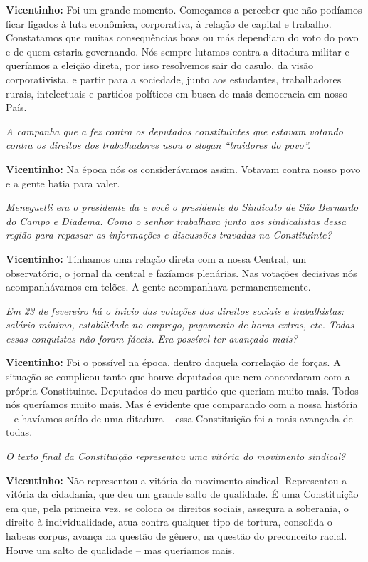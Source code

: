 \textbf{Vicentinho:} Foi um grande momento. Começamos a perceber que não
podíamos ficar ligados à luta econômica, corporativa, à relação de
capital e trabalho. Constatamos que muitas consequências boas ou más
dependiam do voto do povo e de quem estaria governando. Nós sempre
lutamos contra a ditadura militar e queríamos a eleição direta, por isso
resolvemos sair do casulo, da visão corporativista, e partir para a
sociedade, junto aos estudantes, trabalhadores rurais, intelectuais e
partidos políticos em busca de mais democracia em nosso País.

\emph{A campanha que a  fez contra os deputados constituintes que
estavam votando contra os direitos dos trabalhadores usou o slogan
``traidores do povo''.}

\textbf{Vicentinho:} Na época nós os considerávamos assim. Votavam
contra nosso povo e a gente batia para valer.

\emph{Meneguelli era o presidente da  e você o presidente do
Sindicato de São Bernardo do Campo e Diadema. Como o senhor trabalhava
junto aos sindicalistas dessa região para repassar as informações e
discussões travadas na Constituinte?}

\textbf{Vicentinho:} Tínhamos uma relação direta com a nossa Central, um
observatório, o jornal da central e fazíamos plenárias. Nas votações
decisivas nós acompanhávamos em telões. A gente acompanhava
permanentemente.

\emph{Em 23 de fevereiro há o inicio das votações dos direitos sociais
e trabalhistas: salário mínimo, estabilidade no emprego, pagamento de
horas extras, etc. Todas essas conquistas não foram fáceis. Era
possível ter avançado mais?}

\textbf{Vicentinho:} Foi o possível na época, dentro daquela correlação
de forças. A situação se complicou tanto que houve deputados que nem
concordaram com a própria Constituinte. Deputados do meu partido que
queriam muito mais. Todos nós queríamos muito mais. Mas é evidente que
comparando com a nossa história -- e havíamos saído de uma ditadura --
essa Constituição foi a mais avançada de todas.

\emph{O texto final da Constituição representou uma vitória do
movimento sindical?}

\textbf{Vicentinho:} Não representou a vitória do movimento sindical.
Representou a vitória da cidadania, que deu um grande salto de
qualidade. É uma Constituição em que, pela primeira vez, se coloca os
direitos sociais, assegura a soberania, o direito à individualidade,
atua contra qualquer tipo de tortura, consolida o habeas corpus, avança
na questão de gênero, na questão do preconceito racial. Houve um salto
de qualidade -- mas queríamos mais.

